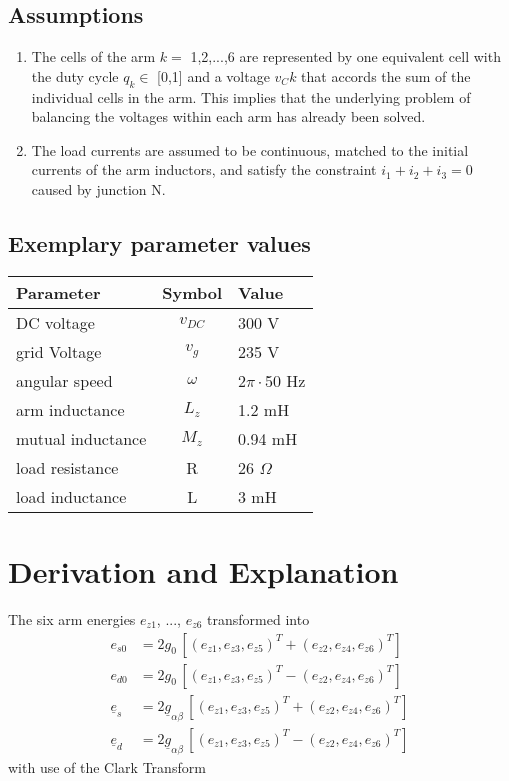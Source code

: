 \documentclass[10pt,a4paper]{article}
\begin{document}
	\subsection{Assumptions}	
	\begin{enumerate}
		\item The cells of the arm $k=$ 1,2,...,6 are represented by one equivalent cell with the duty cycle $q_k \in$ [0,1] and a voltage $v_Ck$ that accords the sum of the individual cells in the arm. This implies that the
		underlying problem of balancing the voltages within each
		arm has already been solved.
		\item The load currents are assumed to be continuous, matched
		to the initial currents of the arm inductors, and satisfy the
		constraint $i_1 + i_2 + i_3 = 0$ caused by junction N.
	\end{enumerate}
	
	\subsection{Exemplary parameter values}
	\begin{tabular}{lcl}		
		Parameter & Symbol & Value \\ \hline
		DC voltage & $v_{DC}$ & 300 V \\ 
		grid Voltage & $v_g$ & 	235 V \\
		angular speed & $\omega $ & 2$\pi\cdot$50 Hz \\
		arm inductance & $L_z$ & 1.2 mH \\
		mutual inductance & $M_z$ & 0.94 mH \\
		load resistance & R & 26 $\Omega$ \\
		load inductance & L & 3 mH	
	\end{tabular}

	\section{Derivation and Explanation} 
	The six arm energies $e_{z1}$, ..., $e_{z6}$ transformed into  
	\begin{subequations}	
	\begin{align}
		e_{s0} &= 2g_0 \, [(e_{z1},e_{z3},e_{z5})^T+(e_{z2},e_{z4},e_{z6})^T] 	\\
		e_{d0} &=2g_0 \, [(e_{z1},e_{z3},e_{z5})^T-(e_{z2},e_{z4},e_{z6})^T]	\\
		\underline{e}_s &=2\underline{g}_{\alpha\beta} \, [(e_{z1},e_{z3},e_{z5})^T+(e_{z2},e_{z4},e_{z6})^T]	\\
		\underline{e}_d &=2\underline{g}_{\alpha\beta} \, [(e_{z1},e_{z3},e_{z5})^T-(e_{z2},e_{z4},e_{z6})^T]
	\end{align}	
	\end{subequations}
	with use of the Clark Transform
	
\end{document}

